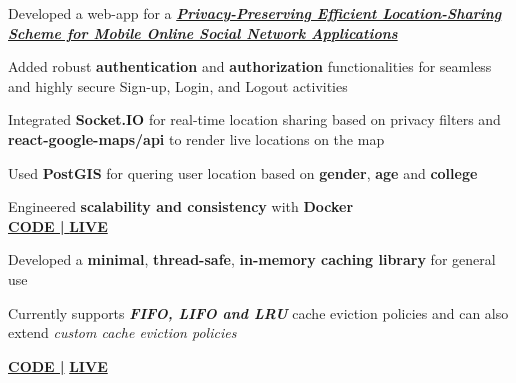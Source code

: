 \documentclass[]{deedy-resume-openfont}
\begin{document}
\begin{minipage}[t]{0.66\textwidth}
\vspace{\topsep} %
\begin{tightemize}
\item  Developed a web-app for a \href{https://ieeexplore.ieee.org/abstract/document/9288801}{\textbf{\textit{Privacy-Preserving Efficient Location-Sharing Scheme for Mobile Online Social Network Applications}} } \\
\item Added robust \textbf{authentication} and \textbf{authorization }functionalities for seamless and highly secure Sign-up, Login, and Logout activities \\
\item Integrated \textbf{Socket.IO} for real-time location sharing based on privacy filters and \textbf{react-google-maps/api} to render live locations on the map\\

\item Used \textbf{PostGIS} for quering user location based on \textbf{gender}, \textbf{age} and \textbf{college} \\
\item  Engineered \textbf{scalability and consistency} with \textbf{Docker} \\
\sectionsep
\href{https://github.com/sanam2405/PrivacyNetwork}{\textbf{CODE |} }
\href{https://manaspratimbiswas.com/PrivacyNetwork/}{\textbf{LIVE}}
\end{tightemize}
\sectionsep


\vspace{\topsep}
\begin{tightemize} 
\sectionsep
\item Developed a \textbf{minimal}, \textbf{thread-safe}, \textbf{in-memory caching library} for general use
\item Currently supports \textit{\textbf{FIFO, LIFO and LRU}} cache eviction policies and can also extend \textit{custom cache eviction policies}
  
\sectionsep
\href{https://github.com/sanam2405/memecache}{\textbf{CODE |}}
\href{https://manaspratimbiswas.com/memecache/}{\textbf{LIVE}}
\end{tightemize}
\sectionsep


\end{minipage}
\end{document}
